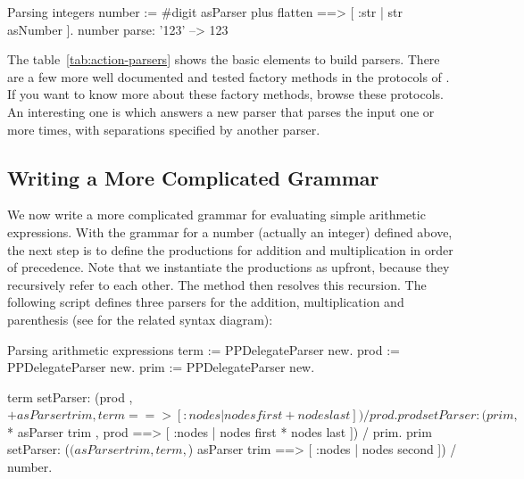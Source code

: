 \documentclass[a4paper,10pt,twoside]{book}
\begin{document}
\begin{script}[number]{Parsing integers}
number :=  #digit asParser plus flatten ==> [ :str | str asNumber ].
number parse: '123'                     --> 123
\end{script}


The table~\ref{tab:action-parsers} shows the basic elements to build
parsers. There are a few more well documented and tested factory
methods in the  protocols of . If you
want to know more about these factory methods, browse these protocols.
An interesting one is  which answers a new parser
that parses the input one or more times, with separations specified by
another parser.

\subsection{Writing a More Complicated Grammar}

We now write a more complicated grammar for evaluating simple
arithmetic expressions. With the grammar for a number (actually an
integer) defined above, the next step is to define the productions for
addition and multiplication in order of precedence. Note that we
instantiate the productions as  upfront,
because they recursively refer to each other. The method
 then resolves this recursion. The following script
defines three parsers for the addition, multiplication and parenthesis
(see  for the related syntax diagram):

\begin{script}[arithmetic]{Parsing arithmetic expressions}
term := PPDelegateParser new.
prod := PPDelegateParser new.
prim := PPDelegateParser new.

term setParser: (prod , $+ asParser trim , term ==> [ :nodes | nodes first + nodes last ])
                     / prod.
prod setParser: (prim , $* asParser trim , prod ==> [ :nodes | nodes first * nodes last ])
                     / prim.
prim setParser: ($( asParser trim , term , $) asParser trim ==> [ :nodes | nodes second ])
                     / number.
\end{script}
\end{document}
